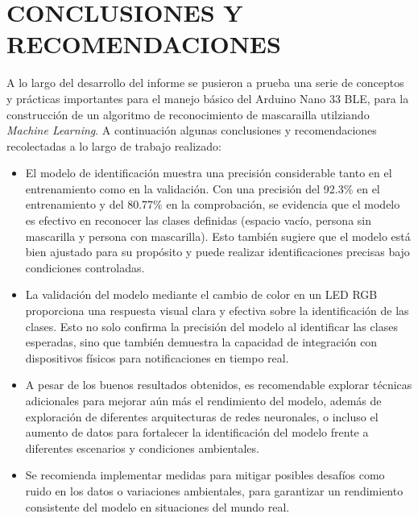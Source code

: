 \newpage
\section{CONCLUSIONES Y RECOMENDACIONES}
A lo largo del desarrollo del informe se pusieron a prueba una serie de conceptos y prácticas importantes para el manejo básico del Arduino Nano 33 BLE, para la construcción de un algoritmo de reconocimiento de mascarailla utilziando \textit{Machine Learning}. A continuación algunas conclusiones y recomendaciones recolectadas a lo largo de trabajo realizado: 

\begin{itemize}
    \item El modelo de identificación muestra una precisión considerable tanto en el entrenamiento como en la validación. Con una precisión del 92.3\% en el entrenamiento y del 80.77\% en la comprobación, se evidencia que el modelo es efectivo en reconocer las clases definidas (espacio vacío, persona sin mascarilla y persona con mascarilla). Esto también sugiere que el modelo está bien ajustado para su propósito y puede realizar identificaciones precisas bajo condiciones controladas.

    \item La validación del modelo mediante el cambio de color en un LED RGB proporciona una respuesta visual clara y efectiva sobre la identificación de las clases. Esto no solo confirma la precisión del modelo al identificar las clases esperadas, sino que también demuestra la capacidad de integración con dispositivos físicos para notificaciones en tiempo real.
    
    \item A pesar de los buenos resultados obtenidos, es recomendable explorar técnicas adicionales para mejorar aún más el rendimiento del modelo, además de exploración de diferentes arquitecturas de redes neuronales, o incluso el aumento de datos para fortalecer la identificación del modelo frente a diferentes escenarios y condiciones ambientales.

    \item Se recomienda implementar medidas para mitigar posibles desafíos como ruido en los datos o variaciones ambientales, para garantizar un rendimiento consistente del modelo en situaciones del mundo real.
\end{itemize} 